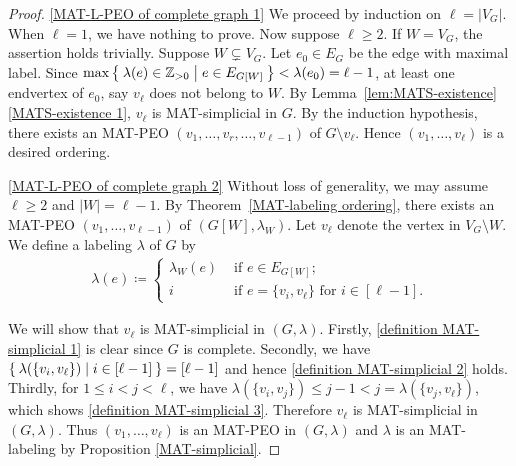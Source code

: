 \documentclass[ALCO, Unicode,published]{cedram}
\begin{document}
\begin{proof}
\ref{MAT-L-PEO of complete graph 1}
We proceed by induction on $ \ell = |V_{G}| $. 
When $ \ell = 1 $, we have nothing to prove. 
Now suppose $ \ell \geq 2 $. 
If $ W = V_{G} $, the assertion holds trivially. 
Suppose $ W \subsetneq V_{G} $. 
Let $ e_{0}\in E_G $ be the edge with maximal label. 
Since $ \max\Set{\lambda(e) \in \mathbb{Z}_{>0} | e \in E_{G[W]}} < \lambda(e_{0}) = \ell-1 $, at least one endvertex of $ e_{0} $, say $ v_{\ell} $  does not belong to $ W $. 
By Lemma~\ref{lem:MATS-existence}\ref{MATS-existence 1}, $ v_{\ell} $ is MAT-simplicial in $ G $. 
By the induction hypothesis, there exists an MAT-PEO $ (v_{1}, \dots, v_{r}, \dots, v_{\ell-1}) $ of $ G\setminus v_{\ell} $. 
Hence $ (v_{1}, \dots, v_{\ell}) $ is a desired ordering. 

\ref{MAT-L-PEO of complete graph 2} 
Without loss of generality, we may assume $ \ell \geq 2 $ and $|W| = \ell - 1 $. 
By Theorem~\ref{MAT-labeling ordering}, there exists an MAT-PEO $ (v_{1}, \dots, v_{\ell-1}) $ of $ (G[W], \lambda_{W}) $.
Let $ v_{\ell} $ denote the vertex in $ V_{G}\setminus W $. 
We define a labeling $ \lambda $ of $ G $ by 
\begin{align*}
\lambda(e) \coloneqq
\begin{cases}
\lambda_{W}(e) & \text{ if } e \in E_{G[W]}; \\
i &  \text{ if } e = \{v_{i}, v_{\ell}\} \text{ for } i \in  [\ell -1]. 
\end{cases}
\end{align*}

We will show that $ v_{\ell} $ is MAT-simplicial in $ (G,\lambda) $. 
Firstly, \ref{definition MAT-simplicial 1} is clear since $ G $ is complete. 
Secondly, we have $ \Set{\lambda(\{v_{i}, v_{\ell}\}) | i \in [\ell-1]} = [\ell-1] $ and hence \ref{definition MAT-simplicial 2} holds. 
Thirdly, for $ 1\le i < j < \ell $, we have $ \lambda(\{v_{i}, v_{j}\}) \leq j-1 < j = \lambda(\{v_{j}, v_{\ell}\}) $, which shows \ref{definition MAT-simplicial 3}. 
Therefore $ v_{\ell} $ is MAT-simplicial in $ (G,\lambda) $. 
Thus $ (v_{1}, \dots, v_{\ell} )$ is an MAT-PEO in $ (G, \lambda) $ and $ \lambda $ is an MAT-labeling by Proposition \ref{MAT-simplicial}.
\end{proof}
\end{document}
